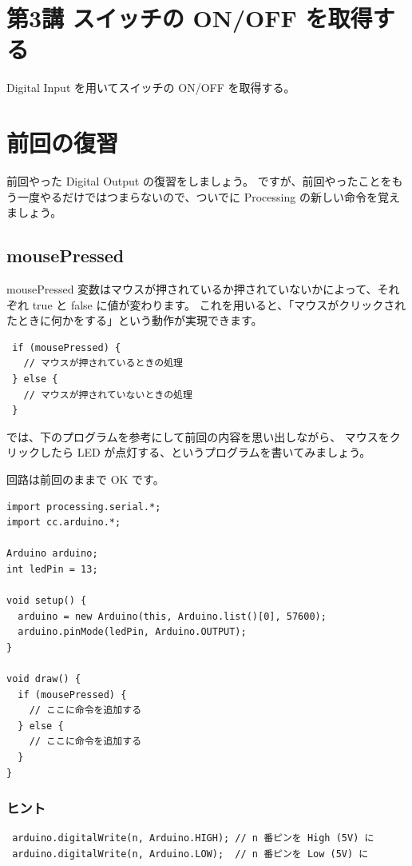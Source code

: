 \documentclass[11pt,a4paper]{jarticle}
\begin{document}
\section*{\LARGE{第3講 スイッチの ON/OFF を取得する}}
Digital Input を用いてスイッチの ON/OFF を取得する。


\section{前回の復習}
前回やった Digital Output の復習をしましょう。
ですが、前回やったことをもう一度やるだけではつまらないので、ついでに Processing の新しい命令を覚えましょう。

\subsection*{mousePressed}
mousePressed 変数はマウスが押されているか押されていないかによって、それぞれ true と false に値が変わります。
これを用いると、「マウスがクリックされたときに何かをする」という動作が実現できます。

\begin{lstlisting}
 if (mousePressed) {
   // マウスが押されているときの処理
 } else {
   // マウスが押されていないときの処理
 }
\end{lstlisting}

では、下のプログラムを参考にして前回の内容を思い出しながら、
マウスをクリックしたら LED が点灯する、というプログラムを書いてみましょう。

回路は前回のままで OK です。

\begin{lstlisting}
import processing.serial.*;
import cc.arduino.*;
 
Arduino arduino;
int ledPin = 13;
 
void setup() {
  arduino = new Arduino(this, Arduino.list()[0], 57600);
  arduino.pinMode(ledPin, Arduino.OUTPUT);
}
 
void draw() {
  if (mousePressed) {
    // ここに命令を追加する
  } else {
    // ここに命令を追加する
  }
}
\end{lstlisting}

\subsubsection*{ヒント}
\begin{lstlisting}
 arduino.digitalWrite(n, Arduino.HIGH); // n 番ピンを High (5V) に
 arduino.digitalWrite(n, Arduino.LOW);  // n 番ピンを Low (5V) に
\end{lstlisting}
\end{document}
